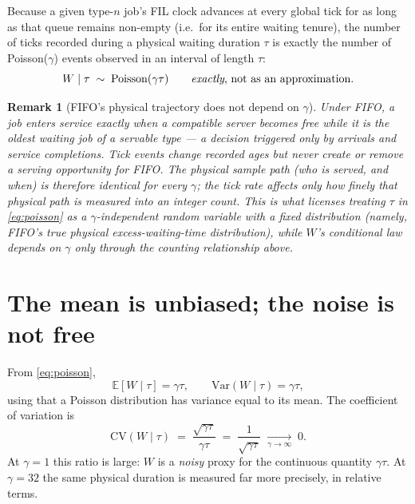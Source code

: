 \documentclass[11pt,a4paper]{article}
\newcommand{\E}{\mathbb{E}}
\newcommand{\Var}{\mathrm{Var}}
\newtheorem{remark}{Remark}
\begin{document}
Because a given type-$n$ job's FIL clock advances at every global tick for as
long as that queue remains non-empty (i.e.\ for its entire waiting tenure),
the number of ticks recorded during a physical waiting duration $\tau$ is
exactly the number of Poisson($\gamma$) events observed in an interval of
length $\tau$:
\begin{equation}
  W \mid \tau \;\sim\; \mathrm{Poisson}(\gamma\tau)
  \qquad\text{\emph{exactly}, not as an approximation.}
  \label{eq:poisson}
\end{equation}

\begin{remark}[FIFO's physical trajectory does not depend on $\gamma$]
Under FIFO, a job enters service exactly when a compatible server becomes
free while it is the oldest waiting job of a servable type --- a decision
triggered only by arrivals and service completions.  Tick events change
recorded ages but never create or remove a serving opportunity for FIFO.  The
physical sample path (who is served, and when) is therefore identical for
every $\gamma$; the tick rate affects only how finely that physical path is
\emph{measured} into an integer count.  This is what licenses treating $\tau$
in \eqref{eq:poisson} as a $\gamma$-independent random variable with a fixed
distribution (namely, FIFO's true physical excess-waiting-time distribution),
while $W$'s conditional law depends on $\gamma$ only through the counting
relationship above.
\end{remark}

\section{The mean is unbiased; the noise is not free}

From \eqref{eq:poisson},
\begin{equation}
  \E[W \mid \tau] = \gamma\tau,
  \qquad
  \Var(W \mid \tau) = \gamma\tau,
  \label{eq:moments}
\end{equation}
using that a Poisson distribution has variance equal to its mean.  The
coefficient of variation is
\begin{equation}
  \mathrm{CV}(W\mid\tau) \;=\; \frac{\sqrt{\gamma\tau}}{\gamma\tau}
  \;=\; \frac{1}{\sqrt{\gamma\tau}} \;\xrightarrow[\gamma\to\infty]{} \;0.
  \label{eq:cv}
\end{equation}
At $\gamma = 1$ this ratio is large: $W$ is a \emph{noisy} proxy for the
continuous quantity $\gamma\tau$.  At $\gamma = 32$ the same physical duration
is measured far more precisely, in relative terms.
\end{document}
